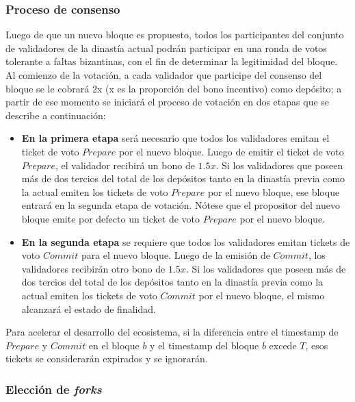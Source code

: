 \subsubsection{Proceso de consenso}
\label{pod:design:consensus}

Luego de que un nuevo bloque es propuesto, todos los participantes del conjunto de validadores de la dinastía actual podrán participar en una ronda de votos tolerante a faltas bizantinas, con el fin de determinar la legitimidad del bloque. Al comienzo de la votación, a cada validador que participe del consenso del bloque se le cobrará 2x (x es la proporción del bono incentivo) como depósito; a partir de ese momento se iniciará el proceso de votación en dos etapas que se describe a continuación:

\begin{itemize}

\item \textbf{En la primera etapa} será necesario que todos los validadores emitan el ticket de voto $Prepare$ por el nuevo bloque. Luego de emitir el ticket de voto $Prepare$, el validador recibirá un bono de $1.5x$. Si los validadores que poseen más de dos tercios del total de los depósitos tanto en la dinastía previa como la actual emiten los tickets de voto $Prepare$ por el nuevo bloque, ese bloque entrará en la segunda etapa de votación. Nótese que el propositor del nuevo bloque emite por defecto un ticket de voto $Prepare$ por el nuevo bloque.

\item \textbf{En la segunda etapa} se requiere que todos los validadores emitan tickets de voto $Commit$ para el nuevo bloque. Luego de la emisión de $Commit$, los validadores recibirán otro bono de $1.5x$. Si los validadores que poseen más de dos tercios del total de los depósitos tanto en la dinastía previa como la actual emiten los tickets de voto $Commit$ por el nuevo bloque, el mismo alcanzará el estado de finalidad.
\end{itemize}

Para acelerar el desarrollo del ecosistema, si la diferencia entre el timestamp de $Prepare$ y $Commit$ en el bloque $b$ y el timestamp del bloque $b$ excede $T$, esos tickets se considerarán expirados y se ignorarán.

\subsubsection{Elección de \textit{forks}}
\label{pod:design:fork}

